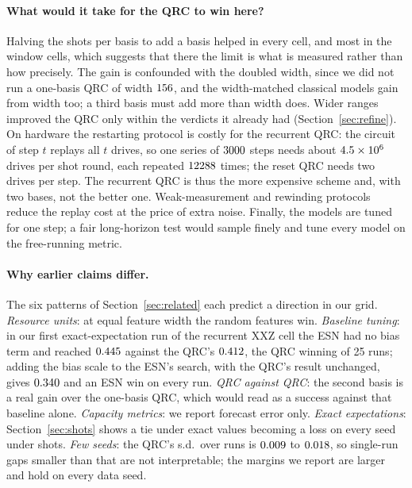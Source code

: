 \documentclass[11pt,a4paper]{article}
\begin{document}
\paragraph{What would it take for the QRC to win here?} Halving the shots per basis to add a basis
helped in every cell, and most in the window cells, which suggests that there the limit is what is
measured rather than how precisely. The gain is confounded with the doubled width, since we did not
run a one-basis QRC of width $156$, and the width-matched classical models gain from width too;
a third basis must add more than width does. Wider ranges improved the QRC only within the
verdicts it already had (Section~\ref{sec:refine}).
On hardware the restarting protocol is costly for the recurrent QRC: the circuit of step $t$
replays all $t$ drives, so one series of $3000$ steps needs about $4.5\times10^{6}$ drives per shot
round, each repeated $12288$ times; the reset QRC needs two drives per step. The recurrent QRC is
thus the more expensive scheme and, with two bases, not the better one. Weak-measurement and
rewinding protocols~\cite{mujal2023} reduce the replay cost at the price of extra noise. Finally, the
models are tuned for one step; a fair long-horizon test would sample finely and tune every model on
the free-running metric.

\paragraph{Why earlier claims differ.} The six patterns of Section~\ref{sec:related} each predict a
direction in our grid. \emph{Resource units}: at equal feature width the random features win.
\emph{Baseline tuning}: in our first exact-expectation run of the recurrent XXZ cell the ESN had no
bias term and reached $0.445$ against the QRC's $0.412$, the QRC winning \noBiasQrcWins{}
of 25 runs; adding the bias scale to the ESN's search, with the QRC's result unchanged, gives
$0.340$ and an ESN win on every run. \emph{QRC against QRC}: the second basis is a real gain over
the one-basis QRC, which would read as a success against that baseline alone. \emph{Capacity
metrics}: we report forecast error only. \emph{Exact expectations}: Section~\ref{sec:shots} shows a
tie under exact values becoming a loss on every seed under shots. \emph{Few seeds}: the QRC's s.d.\
over runs is $0.009$ to $0.018$, so single-run gaps smaller than that are not interpretable;
the margins we report are larger and hold on every data seed.
\end{document}
